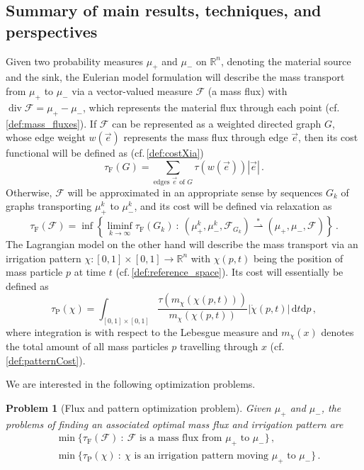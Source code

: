 \documentclass[10pt,a4paper,oneside,final]{article}
\newcommand{\R}{{\mathbb{R}}}
\newcommand{\de}{{\mathrm{d}}}
\DeclareMathOperator{\dv}{div}
\newcommand{\weakstarto}{\stackrel{*}{\rightharpoonup}}
\newcommand{\flux}{{\mathcal{F}}}
\newcommand{\JEnXia}[1][\tau]{#1_{\mathrm{F}}}%
\newcommand{\JEnMMS}[1][\tau]{#1_{\mathrm{P}}}%
\newcommand{\transportPath}{mass flux}
\numberwithin{equation}{section}
\theoremstyle{plain}
\newtheorem{problem}[theorem]{Problem}
\theoremstyle{definition}
\theoremstyle{remark}
\begin{document}
\subsection{Summary of main results, techniques, and perspectives}

Given two probability measures $\mu_+$ and $\mu_-$ on $\R^n$, denoting the material source and the sink,
the Eulerian model formulation will describe the mass transport from $\mu_+$ to $\mu_-$ via a vector-valued measure $\flux$ (a \transportPath{}) with $\dv\flux=\mu_+-\mu_-$, which represents the material flux through each point (cf.\,\cref{def:mass_fluxes}).
If $\flux$ can be represented as a weighted directed graph $G$, whose edge weight $w(\vec e)$ represents the mass flux through edge $\vec e$,
then its cost functional will be defined as (cf.\,\cref{def:costXia})
\begin{equation*}
 \JEnXia(G) = \sum_{\text{edges }\vec e\text{ of }G}\tau(w(\vec e))|\vec e|\,.
\end{equation*}
Otherwise, $\flux$ will be approximated in an appropriate sense by sequences $G_k$ of graphs transporting $\mu_+^k$ to $\mu_-^k$, and its cost will be defined via relaxation as
\begin{equation*}
 \JEnXia(\flux) = \inf\left\{\liminf_{k \to \infty} \JEnXia(G_k) \ : \ (\mu_+^k,\mu_-^k,\flux_{G_k}) \weakstarto (\mu_+,\mu_-,\flux)\right\}\,.
\end{equation*}
The Lagrangian model on the other hand will describe the mass transport via an irrigation pattern $\chi:[0,1]\times[0,1]\to\R^n$ with $\chi(p,t)$ being the position of mass particle $p$ at time $t$ (cf.\,\cref{def:reference_space}).
Its cost will essentially be defined as
\begin{displaymath}
 \JEnMMS(\chi) = \int_{[0,1]\times[0,1]} \frac{\tau(m_\chi(\chi(p,t)))}{m_\chi(\chi(p,t))}|\dot\chi(p,t)|\,\de t\de p\,,
\end{displaymath}
where integration is with respect to the Lebesgue measure and $m_\chi(x)$ denotes the total amount of all mass particles $p$ travelling through $x$ (cf.\,\cref{def:patternCost}).

We are interested in the following optimization problems.
\begin{problem}[Flux and pattern optimization problem]
Given $\mu_+$ and $\mu_-$, the problems of finding an associated optimal \transportPath{} and irrigation pattern are
\begin{equation}\label{eqn:optProblems}
\begin{aligned}
&\min\{\JEnXia(\flux)\ :\ \flux\text{ is a \transportPath{} from }\mu_+\text{ to }\mu_-\}\,,\\
&\min\{\JEnMMS(\chi)\ :\ \chi\text{ is an irrigation pattern moving }\mu_+\text{ to }\mu_-\}\,.
\end{aligned}
\end{equation}
\end{problem}
\end{document}
